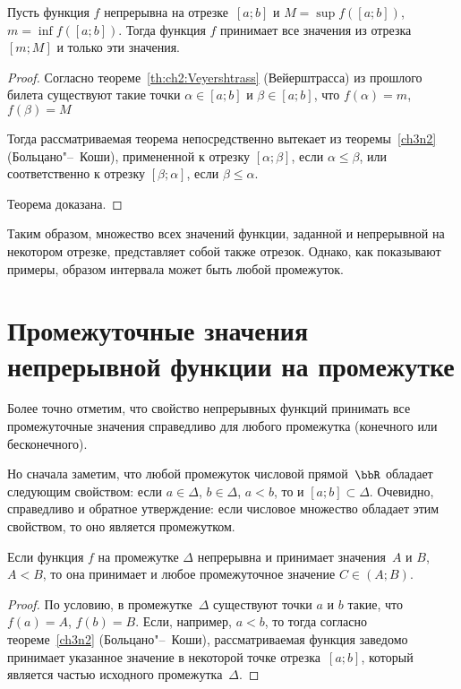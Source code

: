 \begin{thm}
Пусть функция $f$ непрерывна на отрезке~$[a;b]$ и $M=\sup f([a;b]) $, $m=\inf f([a;b])$. Тогда функция $f$ принимает все значения из отрезка $[m;M]$ и только эти значения.
\end{thm}
\begin{proof}
Согласно теореме~\ref{th:ch2:Veyershtrass} (Вейерштрасса) из прошлого билета существуют такие точки $\alpha\in [a;b]$ и $\beta\in [a;b]$, что $f(\alpha)=m$, $f(\beta)=M$

Тогда рассматриваемая теорема непосредственно вытекает из теоремы~\ref{ch3n2} (Больцано"--~Коши), примененной к отрезку $[\alpha;\beta]$, если $\alpha \le \beta$, или соответственно к отрезку $[\beta;\alpha]$, если $\beta \le \alpha$. 

Теорема доказана.
\end{proof} 

Таким образом, множество всех значений функции, заданной и непрерывной на некотором отрезке, представляет собой также отрезок. Однако, как показывают примеры, образом интервала может быть любой промежуток.

\section{Промежуточные значения непрерывной функции на промежутке}

Более точно отметим, что свойство непрерывных функций принимать все промежуточные значения справедливо для любого промежутка (конечного или бесконечного).

Но сначала заметим, что любой промежуток числовой прямой~$\bbR$ обладает следующим свойством: если $a\in\Delta$, $b\in\Delta$, $a<b$, то и $[a;b] \subset \Delta$. Очевидно, справедливо и обратное утверждение: если числовое множество обладает этим свойством, то оно является промежутком.

\begin{thm}
Если функция $f$ на промежутке $\Delta$ непрерывна и принимает значения~$A$ и $B$, $A<B$,  то она принимает и любое промежуточное значение $C\in (A;B)$.
\end{thm}
\begin{proof}
По условию, в промежутке~$\Delta$ существуют точки $a$ и $b$ такие, что $f(a) = A$, $f(b) = B$. Если, например, $a<b$, то тогда согласно теореме~\ref{ch3n2} (Больцано"--~Коши), рассматриваемая функция заведомо принимает указанное значение в некоторой точке отрезка~$[a;b]$, который является частью исходного промежутка~$\Delta$.
\end{proof} 

